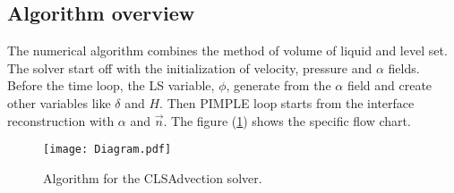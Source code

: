 \subsection{Algorithm overview}
The numerical algorithm combines the method of volume of liquid  and level set. The solver start off with the initialization of velocity, pressure and $\alpha$ fields. Before the time loop, the LS variable, $\phi$, generate from the $\alpha$ field and create other variables like $\delta$ and $H$. Then PIMPLE loop starts from the interface reconstruction with $\alpha$ and $\vec{n}$. The figure (\ref{fig:AlgorithmProcess}) shows the specific flow chart.
\begin{figure}[htbp]
\centering
\texttt{[image: Diagram.pdf]}
\caption{Algorithm for the CLSAdvection solver.}
\label{fig:AlgorithmProcess}
\end{figure}